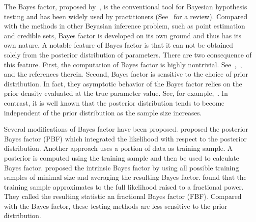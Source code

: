 \documentclass[11pt]{article}
\theoremstyle{plain}
\theoremstyle{definition}
\theoremstyle{remark}
\begin{document}







%


The Bayes factor, proposed by~\cite{scientificInference}, is the conventional tool for Bayesian hypothesis testing and has been widely used by practitioners (See~\cite{Robert1995Bayes} for a review).
Compared with the methods in other Beyasian inference problem, such as point estimation and credible sets, Bayes factor is developed on its own ground and thus has its own nature.
A notable feature of Bayes factor is that it can not be obtained solely from the posterior distribution of parameters.
There are two consequence of this feature.
First, the computation of Bayes factor is highly nontrivial.
See~\cite{Robert1995Bayes},~\cite{MarkovC},~\cite{raftery2006estimating} and the references therein.
Second, Bayes factor is sensitive to the choice of prior distribution. 
In fact, they asymptotic behavior of the Bayes factor relies on the prior density evaluated at the true parameter value. See, for example,~\cite{clarke1990information}.
In contrast, it is well known that the posterior distribution tends to become independent of the prior distribution as the sample size increases.

Several modifications of Bayes factor have been proposed.
\cite{Aitkin1991Posterior} proposed the posterior Bayes factor (PBF) which integrated the likelihood with respect to the posterior distribution.
Another approach uses a portion of data as training sample.
A posterior is computed using the training sample and then be used to calculate Bayes factor.
\cite{intrisicBayesFactor} proposed the intrinsic Bayes factor by using all possible training samples of minimal size and averaging the resulting Bayes factor.
\cite{Fractional1995} found that the training sample approximates to the full likelihood raised to a fractional power.
They called the resulting statistic an fractional Bayes factor (FBF).
Compared with the Bayes factor, these testing methods are less sensitive to the prior distribution.
\end{document}
